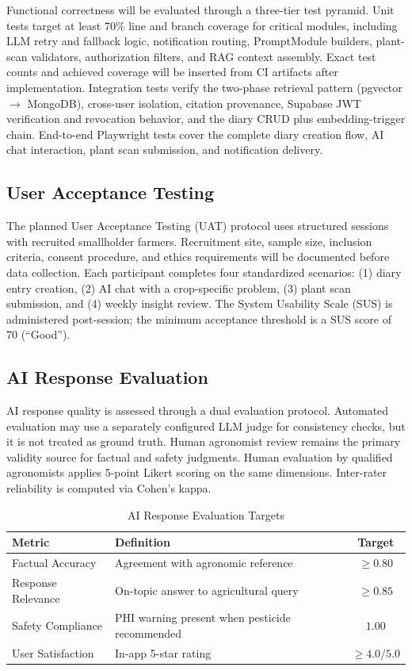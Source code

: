 \documentclass[conference]{IEEEtran}
\begin{document}
Functional correctness will be evaluated through a three-tier test pyramid. Unit tests target at least 70\% line and branch coverage for critical modules, including LLM retry and fallback logic, notification routing, PromptModule builders, plant-scan validators, authorization filters, and RAG context assembly. Exact test counts and achieved coverage will be inserted from CI artifacts after implementation. Integration tests verify the two-phase retrieval pattern (pgvector $\to$ MongoDB), cross-user isolation, citation provenance, Supabase JWT verification and revocation behavior, and the diary CRUD plus embedding-trigger chain. End-to-end Playwright tests cover the complete diary creation flow, AI chat interaction, plant scan submission, and notification delivery.

\subsection{User Acceptance Testing}

The planned User Acceptance Testing (UAT) protocol uses structured sessions with recruited smallholder farmers. Recruitment site, sample size, inclusion criteria, consent procedure, and ethics requirements will be documented before data collection. Each participant completes four standardized scenarios: (1) diary entry creation, (2) AI chat with a crop-specific problem, (3) plant scan submission, and (4) weekly insight review. The System Usability Scale (SUS) is administered post-session; the minimum acceptance threshold is a SUS score of 70 (``Good'').

\subsection{AI Response Evaluation}

AI response quality is assessed through a dual evaluation protocol. Automated evaluation may use a separately configured LLM judge for consistency checks, but it is not treated as ground truth. Human agronomist review remains the primary validity source for factual and safety judgments. Human evaluation by qualified agronomists applies 5-point Likert scoring on the same dimensions. Inter-rater reliability is computed via Cohen's kappa.

\begin{table}[htbp]
\caption{AI Response Evaluation Targets}
\label{tab:ai_eval}
\centering
\begin{tabular}{lp{3.8cm}c}
\toprule
\textbf{Metric} & \textbf{Definition} & \textbf{Target} \\
\midrule
Factual Accuracy & Agreement with agronomic reference & $\geq 0.80$ \\
Response Relevance & On-topic answer to agricultural query & $\geq 0.85$ \\
Safety Compliance & PHI warning present when pesticide recommended & $1.00$ \\
User Satisfaction & In-app 5-star rating & $\geq 4.0 / 5.0$ \\
\bottomrule
\end{tabular}
\end{table}
\end{document}
